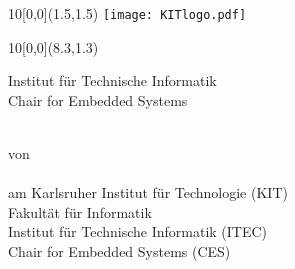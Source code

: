 
\newcommand{\changefont}[3]{\fontfamily{#1} \fontseries{#2} \fontshape{#3} \selectfont}

\newcommand{\diameter}{20}
\newcommand{\xone}{-60}
\newcommand{\xtwo}{440}
\newcommand{\yone}{60}
\newcommand{\ytwo}{-720}


\begin{titlepage}
\setlength{\oddsidemargin}{1cm}
\setlength{\topmargin}{0cm}
\changefont{phv}{m}{n} %


\begin{textblock}{10}[0,0](1.5,1.5)
  \texttt{[image: KITlogo.pdf]}
\end{textblock}
%
\begin{textblock}{10}[0,0](8.3,1.3)
  \begin{flushleft}
    \large
    Institut für Technische Informatik\\
    Chair for Embedded Systems
  \end{flushleft}
\end{textblock}
%
\vspace*{3.5cm}
{
  \centering
  \huge{\thesistitle}

  \vspace*{2cm}
  \large{\thesistype \\
    von
  }\\
  \vspace*{1cm}
  \Large{\student}\\
  \vspace*{1cm}
  \normalsize{
    am Karlsruher Institut für Technologie (KIT)\\
    Fakultät für Informatik\\
    Institut für Technische Informatik (ITEC)\\
    Chair for Embedded Systems (CES)\\
  }

}
\end{titlepage}
